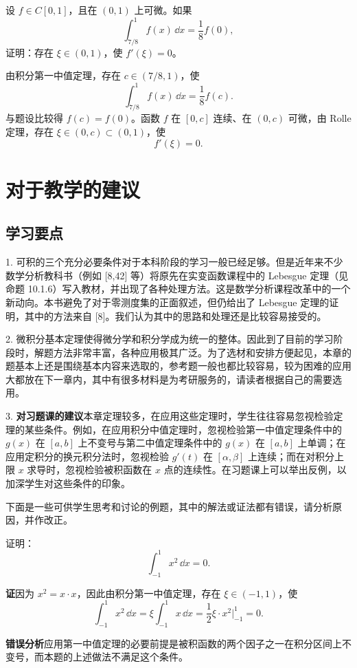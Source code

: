 \begin{xexercise}[12]
设 $f\in C[0,1]$，且在 $(0,1)$ 上可微。如果
\[
  \int_{7/8}^1 f(x)\,\dd x=\frac18f(0),
\]
证明：存在 $\xi\in(0,1)$，使 $f'(\xi)=0$。
\end{xexercise}
\begin{xsolution}
由积分第一中值定理，存在 $c\in(7/8,1)$，使
\[
  \int_{7/8}^1f(x)\,\dd x=\frac18f(c).
\]
与题设比较得 $f(c)=f(0)$。函数 $f$ 在 $[0,c]$ 连续、在 $(0,c)$ 可微，由 Rolle 定理，存在 $\xi\in(0,c)\subset(0,1)$，使
\[
  \boxed{f'(\xi)=0}.
\]
\end{xsolution}



\section{对于教学的建议}

\subsection{学习要点}

1. 可积的三个充分必要条件对于本科阶段的学习一般已经足够。但是近年来不少数学分析教科书（例如 [8,42] 等）将原先在实变函数课程中的 Lebesgue 定理（见命题 10.1.6）写入教材，并出现了各种处理方法。这是数学分析课程改革中的一个新动向。本书避免了对于零测度集的正面叙述，但仍给出了 Lebesgue 定理的证明，其中的方法来自 [8]。我们认为其中的思路和处理还是比较容易接受的。

2. 微积分基本定理使得微分学和积分学成为统一的整体。因此到了目前的学习阶段时，解题方法非常丰富，各种应用极其广泛。为了选材和安排方便起见，本章的题基本上还是围绕基本内容来选取的，参考题一般也都比较容易，较为困难的应用大都放在下一章内，其中有很多材料是为考研服务的，请读者根据自己的需要选用。

3. \textbf{对习题课的建议}\quad 本章定理较多，在应用这些定理时，学生往往容易忽视检验定理的某些条件。例如，在应用积分中值定理时，忽视检验第一中值定理条件中的 $g(x)$ 在 $[a,b]$ 上不变号与第二中值定理条件中的 $g(x)$ 在 $[a,b]$ 上单调；在应用定积分的换元积分法时，忽视检验 $g'(t)$ 在 $[\alpha,\beta]$ 上连续；而在对积分上限 $x$ 求导时，忽视检验被积函数在 $x$ 点的连续性。在习题课上可以举出反例，以加深学生对这些条件的印象。

下面是一些可供学生思考和讨论的例题，其中的解法或证法都有错误，请分析原因，并作改正。

\begin{xexample}[10.5.1]
证明：
\[
  \int_{-1}^1x^2\,\dd x=0.
\]
\end{xexample}
\begin{xsolution}
\textbf{证}\quad 因为 $x^2=x\cdot x$，因此由积分第一中值定理，存在 $\xi\in(-1,1)$，使
\[
  \int_{-1}^1x^2\,\dd x
  =\xi\int_{-1}^1x\,\dd x
  =\frac12\xi\cdot x^2\Big|_{-1}^1=0.
\]

\textbf{错误分析}\quad 应用第一中值定理的必要前提是被积函数的两个因子之一在积分区间上不变号，而本题的上述做法不满足这个条件。
\end{xsolution}

